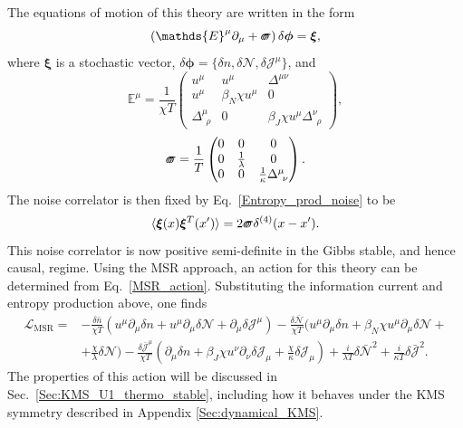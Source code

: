 \documentclass[aps,prd,nofootinbib,amsmath,amssymb,showpacs,longbibliography,singlecolumn,superscriptaddress,notitlepage]{revtex4-1}
\theoremstyle{plain}
\theoremstyle{definition}
\newcommand*{\Scale}[2][4]{\scalebox{#1}{$#2$}}%
\newcommand{\forceds}[1]{\Scale[1.1]{\ensuremath{\mathrlap{{{#1}}}\hspace{1.4pt}#1}}}
\newcommand{\cvec}[1]{\ensuremath{\bm {#1}}}
\newcommand{\cmat}[1]{\ensuremath{\mathds{{#1}}}}
\newcommand{\cmatgreek}[1]{\ensuremath{\forceds{{#1}}}}
\begin{document}
The equations of motion of this theory are written in the form 
\begin{equation}
    \left( \cmat{E}^{\mu} \partial_{\mu} + \cmatgreek{\sigma} \right) \delta \cvec{\phi} = \cvec{\xi} ,
\end{equation}
where $\cvec{\xi}$ is a stochastic vector, $\delta \cvec{\phi} = \{ \delta n, \delta \mathcal{N}, \delta \mathcal{J}^{\mu} \}$, and 
\begin{equation}
    \cmat{E}^{\mu} = \frac{1}{\chi T} \begin{pmatrix}
        u^{\mu} & u^{\mu} & \Delta^{\mu\nu} \\
        u^{\mu} & \beta_N \chi u^{\mu} & 0 \\
        \Delta^{\mu}_{\:\: \rho} & 0 & \beta_J \chi u^{\mu} \Delta^{\nu}_{\:\:\rho}
    \end{pmatrix} ,
\end{equation}
\begin{equation}
    \cmatgreek{\sigma} = \frac{1}{T} \begin{pmatrix}
        0 & 0 & 0 \\
        0 & \frac{1}{\lambda} & 0 \\
        0 & 0 & \frac{1}{\kappa} \Delta^{\mu}_{\:\: \nu} 
    \end{pmatrix} .
\end{equation}
The noise correlator is then fixed by Eq.\ \eqref{Entropy_prod_noise} to be
\begin{equation}
    \langle \cvec{\xi}(x) \cvec{\xi}^T(x') \rangle = 2 \cmatgreek{\sigma} \delta^{(4)}(x-x') .
\end{equation}
This noise correlator is now positive semi-definite in the Gibbs stable, and hence causal, regime. Using the MSR approach, an action for this theory can be determined from Eq.\ \eqref{MSR_action}. Substituting the information current and entropy production above, one finds   
\begin{equation} \label{U1_action_general}
\begin{split}
    \mathcal{L}_{\mathrm{MSR}} = & - \frac{\delta \bar{n}}{\chi T} \left( u^{\mu} \partial_{\mu} \delta n + u^{\mu} \partial_{\mu} \delta \mathcal{N} + \partial_{\mu} \delta \mathcal{J}^{\mu} \right) - \frac{\delta \bar{\mathcal{N}}}{\chi T} \bigg( u^{\mu} \partial_{\mu} \delta n + \beta_N \chi u^{\mu} \partial_{\mu} \delta \mathcal{N} + \\
    & + \frac{\chi}{\lambda} \delta \mathcal{N} \bigg) - \frac{\delta \bar{\mathcal{J}}^{\mu}}{\chi T} \left( \partial_{\mu} \delta n + \beta_J \chi u^{\nu} \partial_{\nu} \delta \mathcal{J}_{\mu} + \frac{\chi}{\kappa} \delta \mathcal{J}_{\mu} \right) + \frac{i}{\lambda T} \delta \bar{\mathcal{N}}^2 + \frac{i}{\kappa T} \delta \bar{\mathcal{J}}^2 .
\end{split}
\end{equation}
The properties of this action will be discussed in Sec.\ \ref{Sec:KMS_U1_thermo_stable}, including how it behaves under the KMS symmetry described in Appendix \ref{Sec:dynamical_KMS}.
\end{document}
